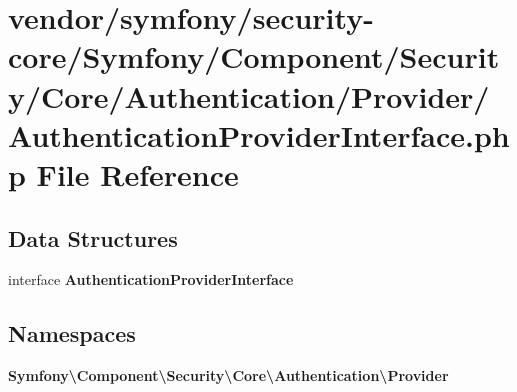 \section{vendor/symfony/security-\/core/\+Symfony/\+Component/\+Security/\+Core/\+Authentication/\+Provider/\+Authentication\+Provider\+Interface.php File Reference}
\label{_authentication_provider_interface_8php}
\subsection*{Data Structures}
\begin{DoxyCompactItemize}
\item 
interface {\bf Authentication\+Provider\+Interface}
\end{DoxyCompactItemize}
\subsection*{Namespaces}
\begin{DoxyCompactItemize}
\item 
 {\bf Symfony\textbackslash{}\+Component\textbackslash{}\+Security\textbackslash{}\+Core\textbackslash{}\+Authentication\textbackslash{}\+Provider}
\end{DoxyCompactItemize}

